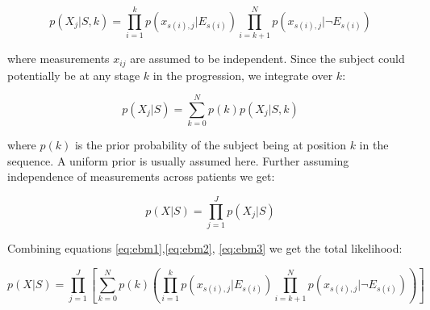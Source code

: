 \begin{equation}
\label{eq:ebm1}
 p(X_j | S, k) = \prod_{i=1}^k p\left(x_{s(i),j} | E_{s(i)} \right) \prod_{i=k+1}^N p\left(x_{s(i),j} | \neg E_{s(i)}\right)
\end{equation}
 
where measurements $x_{ij}$ are assumed to be independent. Since the subject could potentially be at any stage $k$ in the progression, we integrate over $k$:

\begin{equation}
\label{eq:ebm2}
  p(X_j | S) = \sum_{k=0}^N p(k)p(X_j|S,k) 
\end{equation}

where $p(k)$ is the prior probability of the subject being at position $k$ in the sequence. A uniform prior is usually assumed here. Further assuming independence of measurements across patients we get:


\begin{equation}
\label{eq:ebm3}
 p(X|S) = \prod_{j=1}^J p(X_j | S)
\end{equation}

Combining equations \ref{eq:ebm1},\ref{eq:ebm2}, \ref{eq:ebm3} we get the total likelihood:

\begin{equation}
\label{eq:ebm4}
 p(X|S) = \prod_{j=1}^J \left[ \sum_{k=0}^N p(k) \left( \prod_{i=1}^k p\left(x_{s(i),j} | E_{s(i)} \right) \prod_{i=k+1}^N p\left(x_{s(i),j} | \neg E_{s(i)}\right) \right) \right]
\end{equation}



\newcommand{\nodeRad}{0.4cm}

